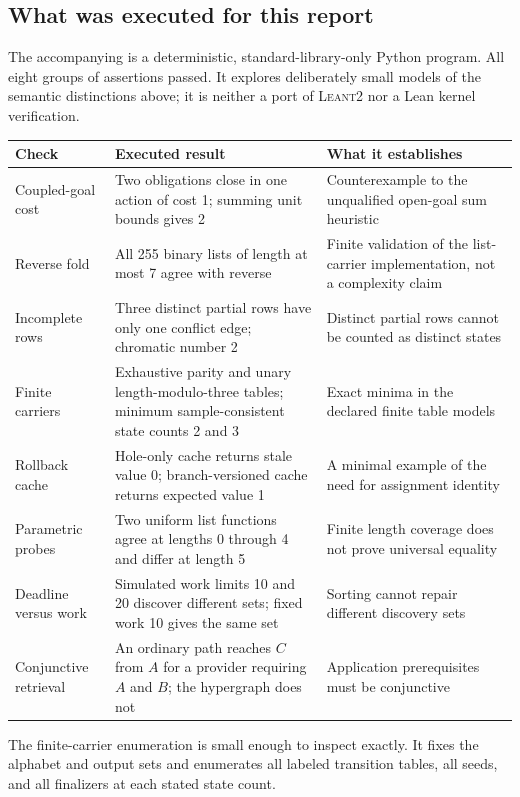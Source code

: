 \documentclass[11pt,a4paper]{article}
\newcommand{\repo}{\textsc{Leant2}}
\theoremstyle{definition}
\theoremstyle{remark}
\begin{document}
\subsection{What was executed for this report}
The accompanying  is a deterministic,
standard-library-only Python program. All eight groups of assertions passed.
It explores deliberately small models of the semantic distinctions above; it
is neither a port of \repo{} nor a Lean kernel verification.

\begin{longtable}{@{}L{32mm}L{66mm}L{50mm}@{}}
\toprule
Check & Executed result & What it establishes\\
\midrule\endhead
Coupled-goal cost & Two obligations close in one action of cost 1; summing unit
bounds gives 2 & Counterexample to the unqualified open-goal sum heuristic\\
Reverse fold & All 255 binary lists of length at most 7 agree with reverse &
Finite validation of the list-carrier implementation, not a complexity claim\\
Incomplete rows & Three distinct partial rows have only one conflict edge;
chromatic number 2 & Distinct partial rows cannot be counted as distinct states\\
Finite carriers & Exhaustive parity and unary length-modulo-three tables;
minimum sample-consistent state counts 2 and 3 & Exact minima in the declared
finite table models\\
Rollback cache & Hole-only cache returns stale value 0; branch-versioned cache
returns expected value 1 & A minimal example of the need for assignment identity\\
Parametric probes & Two uniform list functions agree at lengths 0 through 4 and
differ at length 5 & Finite length coverage does not prove universal equality\\
Deadline versus work & Simulated work limits 10 and 20 discover different sets;
fixed work 10 gives the same set & Sorting cannot repair different discovery sets\\
Conjunctive retrieval & An ordinary path reaches $C$ from $A$ for a provider
requiring $A$ and $B$; the hypergraph does not & Application prerequisites must
be conjunctive\\
\bottomrule
\end{longtable}
The finite-carrier enumeration is small enough to inspect exactly. It fixes the
alphabet and output sets and enumerates all labeled transition tables, all
seeds, and all finalizers at each stated state count.
\end{document}
